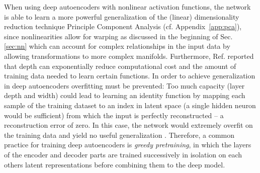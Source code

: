 \documentclass[../../main.tex]{subfiles}
\begin{document}
When using deep autoencoders with nonlinear activation functions, the network is able to learn a more powerful generalization of the (linear) dimensionality reduction technique Principle Component Analysis (cf. Appendix~\ref{app:pca}), since nonlinearities allow for warping as discussed in the beginning of Sec. \ref{sec:nn} which can account for complex relationships in the input data by allowing transformations to more complex manifolds. Furthermore, Ref.\cite{Goodfellow16} reported that depth can exponentially reduce computational cost and the amount of training data needed to learn certain functions. In order to achieve generalization in deep autoencoders overfitting must be prevented: Too much capacity (layer depth and width) could lead to learning an identity function by mapping each sample of the training dataset to an index in latent space (a single hidden neuron would be sufficient) from which the input is perfectly reconstructed -- a reconstruction error of zero. In this case, the network would extremely overfit on the training data and yield no useful generalization \cite{jordan_ae}. Therefore, a common practice for training deep autoencoders is \textit{greedy pretraining}, in which the layers of the encoder and decoder parts are trained successively in isolation on each others latent representations before combining them to the deep model.
\end{document}
